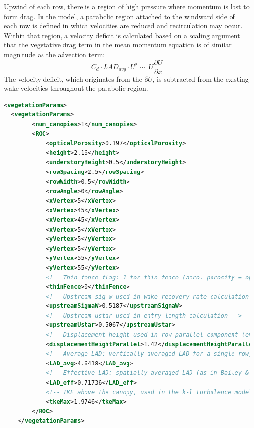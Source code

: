 Upwind of each row, there is a region of high pressure where momentum is lost to form drag. In the model, a parabolic region attached to the windward side of each row is defined in which velocities are reduced and recirculation may occur. Within that region, a velocity deficit is calculated based on a scaling argument that the vegetative drag term in the mean  momentum equation is of similar magnitude as the advection term:
\begin{equation} \label{UDscaling}
     C_d \cdot LAD_{avg} \cdot U^2 \sim \cdot U \frac{\partial U}{\partial x}
 \end{equation}
The velocity deficit, which originates from the $\partial U$, is subtracted from the existing wake velocities throughout the parabolic region.

\begin{lstlisting}[language=XML]
<vegetationParams>
  <vegetationParams>
        <num_canopies>1</num_canopies>
        <ROC>
            <opticalPorosity>0.197</opticalPorosity>
            <height>2.16</height>
            <understoryHeight>0.5</understoryHeight>
            <rowSpacing>2.5</rowSpacing>
            <rowWidth>0.5</rowWidth>
            <rowAngle>0</rowAngle>
            <xVertex>5</xVertex>
            <xVertex>45</xVertex>
            <xVertex>45</xVertex>
            <xVertex>5</xVertex>
            <yVertex>5</yVertex>
            <yVertex>5</yVertex>
            <yVertex>55</yVertex>
            <yVertex>55</yVertex>
            <!-- Thin fence flag: 1 for thin fence (aero. porosity = optical porosity), 2 for vegetative row (aero. por. from LAD) -->
            <thinFence>0</thinFence>
            <!-- Upstream sig_w used in wake recovery rate calculation -->
            <upstreamSigmaW>0.5187</upstreamSigmaW>
            <!-- Upstream ustar used in entry length calculation -->
            <upstreamUstar>0.5067</upstreamUstar>
            <!-- Displacement height used in row-parallel component (empirical) -->
            <displacementHeightParallel>1.42</displacementHeightParallel>
            <!-- Average LAD: vertically averaged LAD for a single row, used in upwind displacement zone drag calculation -->
            <LAD_avg>4.6418</LAD_avg>
            <!-- Effective LAD: spatially averaged LAD (as in Bailey & Stoll, 2013), a bulk drag parameter used in entry length calculation -->
            <LAD_eff>0.71736</LAD_eff>
            <!-- TKE above the canopy, used in the k-l turbulence model -->
            <tkeMax>1.9746</tkeMax>
        </ROC>
    </vegetationParams>
\end{lstlisting}

